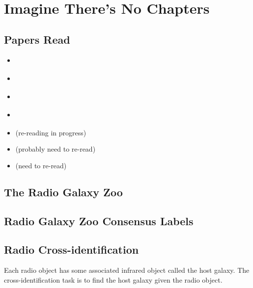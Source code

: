 
\chapter{Imagine There's No Chapters}
\label{cha:imagine}

\section{Papers Read}
\label{sec:papers}
  
  \begin{itemize}
    \item \citet{banfield15}
    \item \citet{yan10}
    \item \citet{yan11}
    \item \citet{dasgupta11}
    \item \citet{mozafari12} (re-reading in progress)
    \item \citet{fan15} (probably need to re-read)
    \item \citet{freund97} (need to re-read)
  \end{itemize}

\section{The Radio Galaxy Zoo}
\label{sec:rgz}

\section{Radio Galaxy Zoo Consensus Labels}

\section{Radio Cross-identification}
\label{sec:cross-identification}

    Each radio object has some associated infrared object called the host
    galaxy. The cross-identification task is to find the host galaxy given the
    radio object.
    
